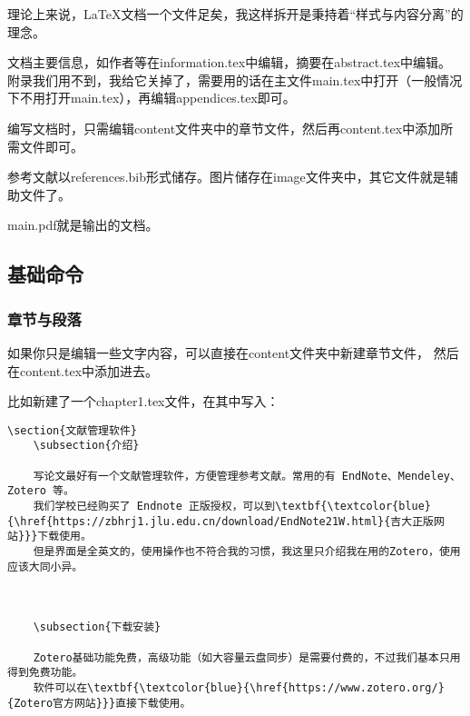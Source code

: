 理论上来说，\LaTeX{}文档一个文件足矣，我这样拆开是秉持着“样式与内容分离”的理念。

文档主要信息，如作者等在information.tex中编辑，摘要在abstract.tex中编辑。
附录我们用不到，我给它关掉了，需要用的话在主文件main.tex中打开（一般情况下不用打开main.tex），再编辑appendices.tex即可。

编写文档时，只需编辑content文件夹中的章节文件，然后再content.tex中添加所需文件即可。

参考文献以references.bib形式储存。图片储存在image文件夹中，其它文件就是辅助文件了。

main.pdf就是输出的文档。

\subsection{基础命令}
\subsubsection{章节与段落}

如果你只是编辑一些文字内容，可以直接在content文件夹中新建章节文件，
然后在content.tex中添加进去。

比如新建了一个chapter1.tex文件，在其中写入：
\begin{center}
\begin{minipage}{0.8\textwidth}
    \hspace{1em}
\begin{lstlisting}[language={[LaTeX]TeX}]
    \section{文献管理软件}
    \subsection{介绍}
    
    写论文最好有一个文献管理软件，方便管理参考文献。常用的有 EndNote、Mendeley、Zotero 等。
    我们学校已经购买了 Endnote 正版授权，可以到\textbf{\textcolor{blue}{\href{https://zbhrj1.jlu.edu.cn/download/EndNote21W.html}{吉大正版网站}}}下载使用。
    但是界面是全英文的，使用操作也不符合我的习惯，我这里只介绍我在用的Zotero，使用应该大同小异。
    
    
    
    \subsection{下载安装}
    
    Zotero基础功能免费，高级功能（如大容量云盘同步）是需要付费的，不过我们基本只用得到免费功能。
    软件可以在\textbf{\textcolor{blue}{\href{https://www.zotero.org/}{Zotero官方网站}}}直接下载使用。
\end{lstlisting}
\end{minipage}
\end{center}

